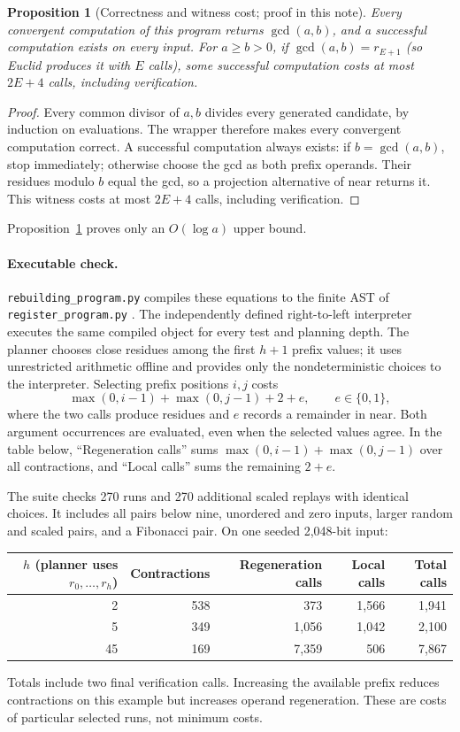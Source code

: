 \documentclass[11pt]{article}
\newtheorem{proposition}{Proposition}
\begin{document}
\begin{proposition}[Correctness and witness cost; proof in this note]
\label{prop:rebuilding}
Every convergent computation of this program returns $\gcd(a,b)$, and a
successful computation exists on every input. For $a\geq b>0$, if
$\gcd(a,b)=r_{E+1}$ (so Euclid produces it with $E$ calls), some successful
computation costs at most $2E+4$ calls, including verification.
\end{proposition}
\begin{proof}
Every common divisor of $a,b$ divides every generated candidate, by induction
on evaluations. The wrapper therefore makes every convergent computation
correct. A successful computation always exists: if $b=\gcd(a,b)$, stop
immediately; otherwise choose the gcd as both prefix operands. Their residues
modulo $b$ equal the gcd, so a projection alternative of near returns it.
This witness costs at most $2E+4$ calls, including verification.
\end{proof}
Proposition~\ref{prop:rebuilding} proves only an $O(\log a)$ upper bound.

\paragraph{Executable check.}
\texttt{rebuilding\_program.py} compiles these equations to the finite AST
of \texttt{register\_program.py} \cite{nondet}. The independently defined
right-to-left interpreter executes the same
compiled object for every test and planning depth. The planner chooses close
residues among the first $h+1$ prefix values; it uses unrestricted arithmetic
offline and provides only the nondeterministic choices to the interpreter.
Selecting prefix positions $i,j$ costs
\[
\max(0,i-1)+\max(0,j-1)+2+e,
\qquad e\in\{0,1\},
\]
where the two calls produce residues and $e$ records a remainder in near.
Both argument occurrences are evaluated, even when the selected values agree.
In the table below, ``Regeneration calls'' sums
$\max(0,i-1)+\max(0,j-1)$ over all contractions, and ``Local calls'' sums
the remaining $2+e$.

The suite checks 270 runs and 270 additional scaled replays with identical
choices. It includes all pairs below nine, unordered and zero inputs, larger
random and scaled pairs, and a Fibonacci pair. On one seeded 2,048-bit input:
\begin{center}
\begin{tabular}{rrrrr}
\toprule
$h$ (planner uses $r_0,\ldots,r_h$) & Contractions & Regeneration calls & Local calls & Total calls\\
\midrule
2 & 538 & 373 & 1,566 & 1,941\\
5 & 349 & 1,056 & 1,042 & 2,100\\
45 & 169 & 7,359 & 506 & 7,867\\
\bottomrule
\end{tabular}
\end{center}
Totals include two final verification calls. Increasing the available prefix
reduces contractions on this example but increases operand regeneration.
These are costs of particular selected runs, not minimum costs.
\end{document}
